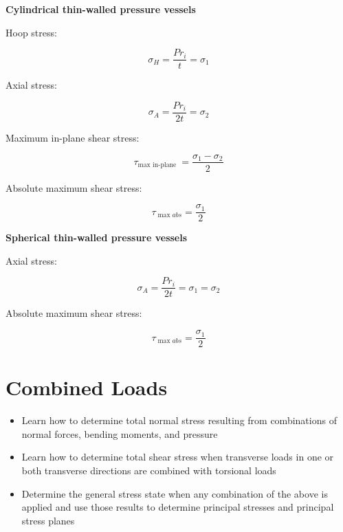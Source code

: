 \documentclass[
  letterpaper,
  DIV=11,
  numbers=noendperiod]{scrreprt}
\providecommand{\tightlist}{%
  \setlength{\itemsep}{0pt}\setlength{\parskip}{0pt}}\usepackage{longtable,booktabs,array}
\begin{document}
\begin{tcolorbox}[enhanced jigsaw, breakable, opacityback=0, toptitle=1mm, left=2mm, colback=white, opacitybacktitle=0.6, colframe=quarto-callout-note-color-frame, titlerule=0mm, arc=.35mm, leftrule=.75mm, bottomtitle=1mm, colbacktitle=quarto-callout-note-color!10!white, rightrule=.15mm, title={Key equations}, bottomrule=.15mm, toprule=.15mm, coltitle=black]

\textbf{Cylindrical thin-walled pressure vessels}

Hoop stress:

\[
\sigma_H=\frac{P r_i}{t}=\sigma_1
\]

Axial stress:

\[
\sigma_A=\frac{P r_i}{2 t}=\sigma_2
\]

Maximum in-plane shear stress:

\[
\tau_{\max \text { in-plane }}=\frac{\sigma_1-\sigma_2}{2}
\]

Absolute maximum shear stress:

\[
\tau_{\max a b s}=\frac{\sigma_1}{2}
\]

\textbf{Spherical thin-walled pressure vessels}

Axial stress:

\[
\sigma_A=\frac{P r_i}{2 t}=\sigma_1=\sigma_2
\]

Absolute maximum shear stress:

\[
\tau_{\max a b s}=\frac{\sigma_1}{2}
\]

\end{tcolorbox}


\chapter{Combined Loads}\label{sec-combined-loads}

\begin{tcolorbox}[enhanced jigsaw, breakable, opacityback=0, toptitle=1mm, left=2mm, colback=white, opacitybacktitle=0.6, colframe=quarto-callout-note-color-frame, titlerule=0mm, arc=.35mm, leftrule=.75mm, bottomtitle=1mm, colbacktitle=quarto-callout-note-color!10!white, rightrule=.15mm, title={Learning Objectives}, bottomrule=.15mm, toprule=.15mm, coltitle=black]

\begin{itemize}
\tightlist
\item
  Learn how to determine total normal stress resulting from combinations
  of normal forces, bending moments, and pressure
\item
  Learn how to determine total shear stress when transverse loads in one
  or both transverse directions are combined with torsional loads
\item
  Determine the general stress state when any combination of the above
  is applied and use those results to determine principal stresses and
  principal stress planes
\end{itemize}

\end{tcolorbox}
\end{document}
